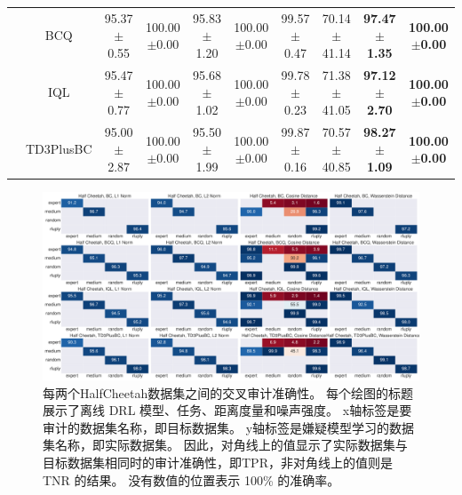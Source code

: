 \begin{table}[!ht]
\begin{tabular}{cccccccccc}
                                                                                           & BCQ                                                                                        & 95.37$\pm$0.55 & 100.00$\pm$0.00 & 95.83$\pm$1.20 & 100.00$\pm$0.00 & 99.57$\pm$0.47 & 70.14$\pm$41.14                              & \textbf{97.47$\pm$1.35} & \textbf{100.00$\pm$0.00}                  \\
                                                                                           & IQL                                                                                        & 95.47$\pm$0.77 & 100.00$\pm$0.00 & 95.68$\pm$1.02 & 100.00$\pm$0.00 & 99.78$\pm$0.23 & 71.38$\pm$41.05                              & \textbf{97.12$\pm$2.70} & \textbf{100.00$\pm$0.00}                  \\
                                                                                           & TD3PlusBC                                                                                  & 95.00$\pm$2.87 & 100.00$\pm$0.00 & 95.50$\pm$1.99 & 100.00$\pm$0.00 & 99.87$\pm$0.16 & 70.57$\pm$40.85                              & \textbf{98.27$\pm$1.09} & \textbf{100.00$\pm$0.00}                  \\
    \cline{1-10}
    \end{tabular}
    \end{table}
    
    \begin{figure}[t]
    \includegraphics[width=\hsize]{figure/orl_auditor/overall_rluply_d4rl_halfcheetah_20230130184110602.pdf}
    \caption{
    每两个HalfCheetah数据集之间的交叉审计准确性。
    每个绘图的标题展示了离线 DRL 模型、任务、距离度量和噪声强度。
    x轴标签是要审计的数据集名称，即目标数据集。
    y轴标签是嫌疑模型学习的数据集名称，即实际数据集。
    因此，对角线上的值显示了实际数据集与目标数据集相同时的审计准确性，即TPR，非对角线上的值则是 TNR 的结果。
    没有数值的位置表示 100\% 的准确率。
    }
    \label{fig:audit result on halfcheetah}
\end{figure}







